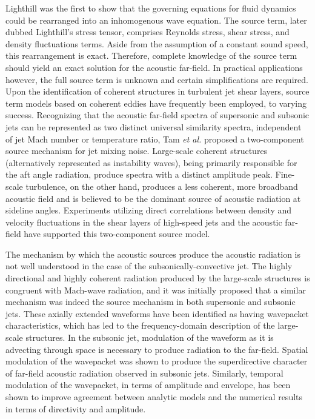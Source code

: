 \documentclass[english]{aiaa-tc}
\begin{document}
 Lighthill\cite{lighthill1963} was the first to show that the governing equations for fluid dynamics could be rearranged into an inhomogenous wave equation. The source term, later dubbed Lighthill's stress tensor, comprises Reynolds stress, shear stress, and density fluctuations terms. Aside from the assumption of a constant sound speed, this rearrangement is exact. Therefore, complete knowledge of the source term should yield an exact solution for the acoustic far-field. In practical applications however, the full source term is unknown and certain simplifications are required. Upon the identification of coherent structures in turbulent jet shear layers\cite{Arndt1997,Mollo-Christensen1967,crow1971,bgl74-1 }, source term models based on coherent eddies have frequently been employed, to varying success. Recognizing that the acoustic far-field spectra of supersonic and subsonic jets can be represented as two distinct universal similarity spectra, independent of jet Mach number or temperature ratio, Tam {\em et al.}\cite{Tam1996} proposed a two-component source mechanism for jet mixing noise. Large-scale coherent structures (alternatively represented as instability waves), being primarily responsible for the aft angle radiation, produce spectra with a distinct amplitude peak. Fine-scale turbulence, on the other hand,  produces a less coherent, more broadband acoustic field and is believed to be the dominant source of acoustic radiation at sideline angles. Experiments utilizing direct correlations between density and velocity fluctuations in the shear layers of high-speed jets and the acoustic far-field have supported this two-component source model\cite{Panda2002,Panda2005b}. 
 
The mechanism by which the acoustic sources produce the acoustic radiation is not well understood in the case of the subsonically-convective jet. The highly directional and highly coherent radiation produced by the large-scale structures is congruent with Mach-wave radiation, and it was initially proposed that a similar mechanism was indeed the source mechanism in both supersonic and subsonic jets\cite{Tam2008}. These axially extended waveforms have been identified as having wavepacket characteristics\cite{JorColo2013}, which has led to the frequency-domain description of the large-scale structures. In the subsonic jet, modulation of the waveform as it is advecting through space is necessary to produce radiation to the far-field. Spatial modulation of the wavepacket was shown to produce the superdirective character of far-field acoustic radiation observed in subsonic jets\cite{Crighton1990}. Similarly, temporal modulation of the wavepacket, in terms of amplitude and envelope, has been shown to improve agreement between analytic models and the numerical results in terms of directivity and amplitude\cite{Sandham2006,Cavalieri2010}. 
\end{document}
